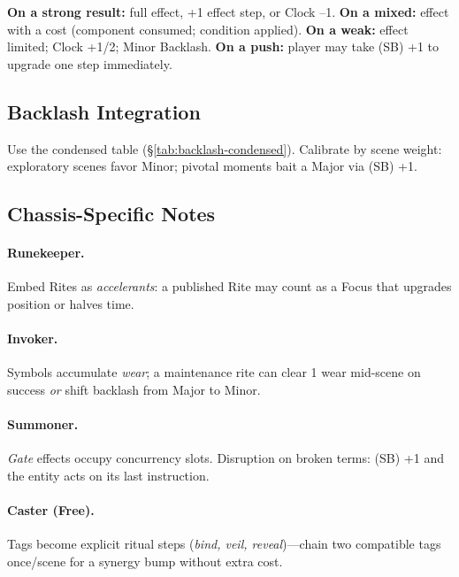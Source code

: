 \begin{tcolorbox}[title={Outcome Palette},colback=gray!5,colframe=black]
\small \textbf{On a strong result:} full effect, +1 effect step, or Clock –1.\newline
\textbf{On a mixed:} effect with a cost (component consumed; condition applied).\newline
\textbf{On a weak:} effect limited; Clock +1/2; Minor Backlash.\newline
\textbf{On a push:} player may take (SB) +1 to upgrade one step immediately.\end{tcolorbox}

\subsection{Backlash Integration}\label{subsec:ritual-backlash}
Use the condensed table (\S\ref{tab:backlash-condensed}). Calibrate by scene weight: exploratory scenes favor Minor; pivotal moments bait a Major via (SB) +1.

\subsection{Chassis-Specific Notes}\label{subsec:ritual-chassis}
\paragraph{Runekeeper.} Embed Rites as \emph{accelerants}: a published Rite may count as a Focus that upgrades position or halves time.
\paragraph{Invoker.} Symbols accumulate \emph{wear}; a maintenance rite can clear 1 wear mid-scene on success \emph{or} shift backlash from Major to Minor.
\paragraph{Summoner.} \emph{Gate} effects occupy concurrency slots. Disruption on broken terms: (SB) +1 and the entity acts on its last instruction.
\paragraph{Caster (Free).} Tags become explicit ritual steps (\emph{bind, veil, reveal})—chain two compatible tags once/scene for a synergy bump without extra cost.

